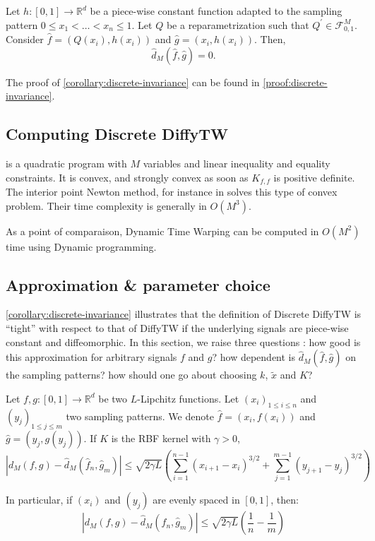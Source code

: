 \begin{corollary}\label{corollary:discrete-invariance}
Let $h: [0, 1] \to \mathbb R^d$ be a piece-wise constant function adapted to the sampling pattern $0 \leq x_1 < \ldots < x_n \leq 1$. Let $Q$ be a reparametrization such that $Q^\prime \in \mathcal F_{0,1}^M$. Consider $\hat f = (Q(x_i), h(x_i))$ and $\hat g = (x_i, h(x_i))$. Then,
\begin{equation}
    \hat d_M(\hat f, \hat g) = 0.
\end{equation}
\end{corollary}
The proof of \cref{corollary:discrete-invariance} can be found in \cref{proof:discrete-invariance}.

\subsection{Computing Discrete DiffyTW}\label{sec:solving-qp}

 is a quadratic program with $M$ variables and linear inequality and equality constraints. It is convex, and strongly convex as soon as $K_{f,f}$ is positive definite. The interior point Newton method, for instance in \cite{fabian} solves this type of convex problem. Their time complexity is generally in $O(M^3)$.

As a point of comparaison, Dynamic Time Warping can be computed in $O(M^2)$ time using Dynamic programming.

\subsection{Approximation \& parameter choice}
\cref{corollary:discrete-invariance} illustrates that the definition of Discrete DiffyTW is ``tight'' with respect to that of DiffyTW if the underlying signals are piece-wise constant and diffeomorphic. In this section, we raise three questions : how good is this approximation for arbitrary signals $f$ and $g$? how dependent is $\hat d_M(\hat f, \hat g)$ on the sampling patterns? how should one go about choosing $k$, $\tilde x$ and $K$?

\begin{theorem}\label{thm:rectangle-approx}
Let $f,g:[0,1] \to \mathbb R^d$ be two $L$-Lipchitz functions. Let $(x_i)_{1\leq i \leq n}$ and $(y_j)_{1\leq j\leq m}$ two sampling patterns. We denote $\hat f = (x_i, f(x_i))$ and $\hat g = (y_j, g(y_j))$.
If $K$ is the RBF kernel with $\gamma > 0$,
\begin{equation}
    \left\vert d_M(f, g) - \hat d_M(\hat f_n, \hat g_m)\right\vert \leq \sqrt{2\gamma L}\left(\sum_{i=1}^{n-1} (x_{i+1} - x_i)^{3/2} + \sum_{j=1}^{m-1} (y_{j+1} - y_j)^{3/2}\right)
\end{equation}

In particular, if $(x_i)$ and $(y_j)$ are evenly spaced in $[0,1]$, then:
\begin{equation}
    \left\vert d_M(f, g) - \hat d_M(\hat f_n, \hat g_m)\right\vert \leq \sqrt{2\gamma L}\left(\frac{1}{n} - \frac{1}{m}\right)
\end{equation}
\end{theorem}

